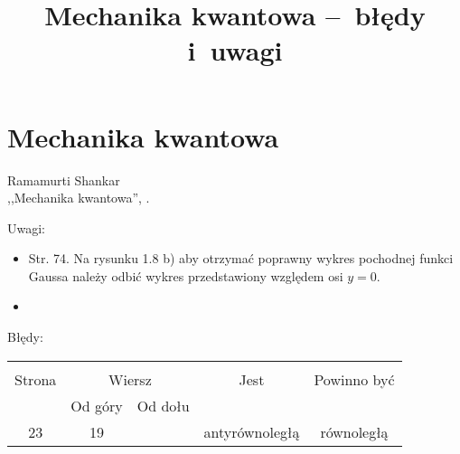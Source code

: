 \documentclass[a4paper,11pt]{article}
\title{Mechanika kwantowa --~błędy i~uwagi}
\begin{document}



\maketitle %



\section{Mechanika kwantowa}

\vspace{\spaceTwo}



\begin{center}
  Ramamurti Shankar\\
  ,,Mechanika kwantowa'', \cite{RSMK}.
\end{center}

Uwagi:
\begin{itemize}
\item Str. 74. Na rysunku 1.8 b) aby otrzymać poprawny wykres
  pochodnej funkci Gaussa należy odbić wykres przedstawiony względem
  osi $y = 0$.
\item
\end{itemize}

Błędy:\\
\begin{tabular}{|c|c|c|c|c|}
  \hline
  & \multicolumn{2}{c|}{} & & \\
  Strona & \multicolumn{2}{c|}{Wiersz} & Jest
                            & Powinno być \\ \cline{2-3}
  & Od góry & Od dołu & & \\
  \hline
  23  & 19 & & antyrównoległą & równoległą \\
  \hline
\end{tabular}
\end{document}
